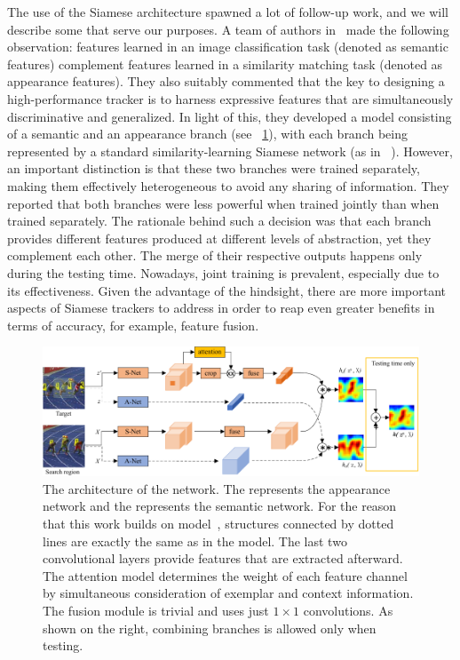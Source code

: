 The use of the Siamese architecture spawned a lot of follow-up work, and we will describe some that serve our purposes. A team of authors in~\cite{he2018twofoldsiam} made the following observation: features learned in an image classification task (denoted as semantic features) complement features learned in a similarity matching task (denoted as appearance features). They also suitably commented that the key to designing a high-performance tracker is to harness expressive features that are simultaneously discriminative and generalized. In light of this, they developed a model consisting of a semantic and an appearance branch (see \figstr{}~\ref{fig:TwofoldSiameseNetArchitecture}), with each branch being represented by a standard similarity-learning Siamese network (as in \siamfc{}~\cite{bertinetto2016siamfc}). However, an important distinction is that these two branches were trained separately, making them effectively heterogeneous to avoid any sharing of information. They reported that both branches were less powerful when trained jointly than when trained separately. The rationale behind such a decision was that each branch provides different features produced at different levels of abstraction, yet they complement each other. The merge of their respective outputs happens only during the testing time. Nowadays, joint training is prevalent, especially due to its effectiveness. Given the advantage of the hindsight, there are more important aspects of Siamese trackers to address in order to reap even greater benefits in terms of accuracy, for example, feature fusion.

\begin{figure}[t]
    \centerline{\includegraphics[width=\linewidth]{figures/theoretical_foundations/twofold_siamese_net_architecture.pdf}}
    \caption[\sasiam{} architecture]{The architecture of the \sasiam{} network. The \anet{} represents the appearance network and the \snet{} represents the semantic network. For the reason that this work builds on \siamfc{} model~\cite{bertinetto2016siamfc}, structures connected by dotted lines are exactly the same as in the \siamfc{} model. The last two convolutional layers provide features that are extracted afterward. The attention model determines the weight of each feature channel by simultaneous consideration of exemplar and context information. The fusion module is trivial and uses just $1 \times 1$ convolutions. As shown on the right, combining branches is allowed only when testing. }
    \label{fig:TwofoldSiameseNetArchitecture}
\end{figure}

